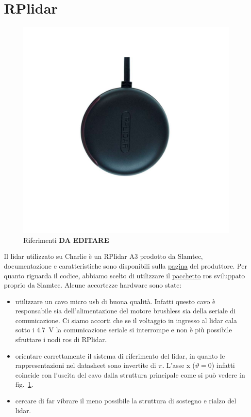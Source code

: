 \section{RPlidar}
\begin{figure}[] 
	\centering    
	\includegraphics[height=.2\textheight]{rplidar_axis.pdf}
	\caption{Riferimenti  \textbf{DA EDITARE}}
	\label{fig: rplidar axis}
\end{figure}

Il lidar utilizzato su Charlie \`e un RPlidar A3 prodotto da Slamtec, documentazione e caratteristiche sono disponibili sulla \href{https://www.slamtec.com/en/Lidar/A3}{pagina} del produttore.
Per quanto riguarda il codice, abbiamo scelto di utilizzare il \href{https://wiki.ros.org/rplidar}{pacchetto} ros sviluppato proprio da Slamtec. 
Alcune accortezze hardware sono state:

\begin{itemize}
	\item utilizzare un cavo micro usb di buona qualit\`a. Infatti questo cavo \`e responsabile sia dell'alimentazione del motore brushless sia della seriale di comunicazione.
			Ci siamo accorti che se il voltaggio in ingresso al lidar cala sotto i \SI{4.7}{\volt} la comunicazione seriale si interrompe e non \`e pi\`u possibile sfruttare i nodi ros
			di RPlidar.

	\item orientare correttamente il sistema di riferimento del lidar, in quanto le rappresentazioni nel datasheet sono invertite di $\pi$. 
	L'asse x ($\vartheta = 0$) infatti coincide con l'uscita del cavo dalla struttura principale come si pu\`o vedere in fig.~\ref{fig: rplidar axis}.

	\item cercare di far vibrare il meno possibile la struttura di sostegno e rialzo del lidar.

\end{itemize}

